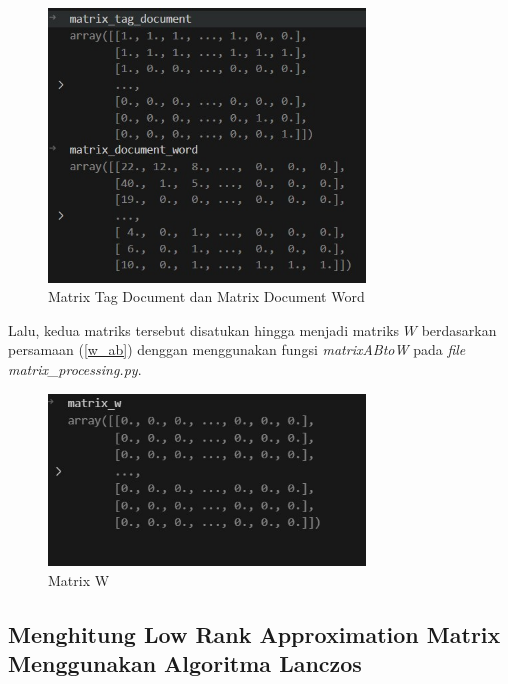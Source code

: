 \begin{figure}[H]
  \centering
  \includegraphics[width=0.75\textwidth]{gambar/bab_4_image/matrix tag document dan matrix document word.jpg}
  \caption{Matrix Tag Document dan Matrix Document Word}
  \label{gambar:matrixTagDocument}
\end{figure}

Lalu, kedua matriks tersebut disatukan hingga menjadi matriks $W$ 
berdasarkan persamaan (\ref{w_ab}) denggan menggunakan fungsi 
\textit{matrixABtoW} pada \textit{file} \textit{matrix\_processing.py}.

\begin{figure}[H]
  \centering
  \includegraphics[width=0.75\textwidth]{gambar/bab_4_image/matrix w.jpg}
  \caption{Matrix W}
  \label{gambar:matrixW}
\end{figure}

\subsection{Menghitung Low Rank Approximation Matrix Menggunakan Algoritma Lanczos}

